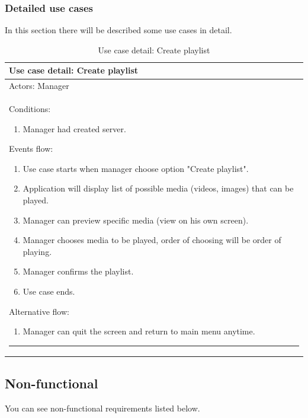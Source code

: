\subsubsection{Detailed use cases}
In this section there will be described some use cases in detail.
\begin{table}[!h]
	\def\arraystretch{1.25}
	\caption{Use case detail: Create playlist}
	\label{tab:usecase1}
	
	\begin{tabular}{p{\textwidth}}
		\toprule
		\textbf{Use case detail: Create playlist} \\
		\midrule
		Actors: Manager \\
		Conditions:
		\begin{enumerate}
			\item Manager had created server.
		\end{enumerate}
		Events flow:
		\begin{enumerate}
			\item Use case starts when manager choose option "Create playlist".
			\item Application will display list of possible media (videos, images) that can be played.
			\item Manager can preview specific media (view on his own screen).
			\item Manager chooses media to be played, order of choosing will be order of playing.
			\item Manager confirms the playlist.
			\item Use case ends.
		\end{enumerate}
		Alternative flow:
		\begin{enumerate}
			\item Manager can quit the screen and return to main menu anytime.
		\end{enumerate}
		\vspace{0.6em}
		\hrule
	\end{tabular}
\end{table}

\subsection{Non-functional}
You can see non-functional requirements listed below.

